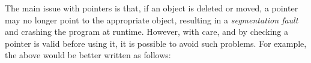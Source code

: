 The main issue with pointers is that, if an object is deleted or moved, a pointer may no longer point to the appropriate object, resulting in a \emph{segmentation fault} and crashing the program at runtime. However, with care, and by checking a pointer is valid before using it, it is possible to avoid such problems. For example, the above would be better written as follows:
\begin{knitrout}\small
{}\color{fgcolor}\begin{kframe}
\noindent
\ttfamily
{}\hlopt{{*}\ }\hlopt{=\ }\hlstd{}\hlstd{}\hlopt{();}\hspace*{\fill}\\
\hlstd{}\hlstd{}\hlopt{(}\hlopt{==\ }\hlstd{}\hlstd{}\hlopt{)\ }\hlstd{}\hlstd{}\hlopt{();}\hspace*{\fill}\\
\hlopt{{*}\ }\hlopt{=\ }\hlopt{{-}$>$}\hlstd{}\hlstd{}\hlopt{();}\hspace*{\fill}\\
\hlstd{}\hlstd{}\hlopt{(}\hlopt{==\ }\hlstd{}\hlstd{}\hlopt{)\ }\hlstd{}\hlstd{}\hlopt{();}\hspace*{\fill}\\
\hlstd{}\hlstd{}\hlopt{(}\hlopt{{-}$>$}\hlstd{}\hlstd{}\hlopt{()\ $<$=\ }\hlopt{)\ }\hlstd{}\hlstd{}\hlopt{();}\hspace*{\fill}\\
\hlopt{{*}\ }\hlopt{=\ }\hlopt{{-}$>$}\hlstd{}\hlstd{}\hlopt{(}\hlopt{){-}$>$}\hlstd{}\hlstd{}\hlopt{();}\hspace*{\fill}\\
\hlstd{}\hlstd{}\hlopt{(}\hlopt{==\ }\hlstd{}\hlstd{}\hlopt{)\ }\hlstd{}\hlstd{}\hlopt{();}\hspace*{\fill}\\
\hlopt{{-}$>$}\hlstd{}\hlstd{}\hlopt{(}\hlopt{,\ }\hlopt{);}\hlstd{}\hspace*{\fill}
\mbox{}
\normalfont
\end{kframe}
\end{knitrout}

